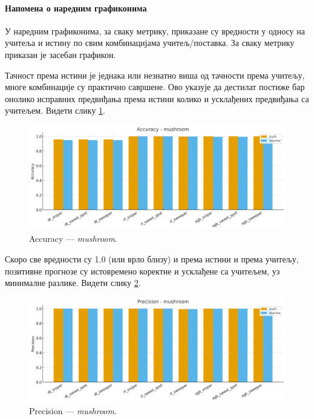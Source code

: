 \paragraph{Напомена о наредним графиконима} У наредним графиконима, за сваку метрику, приказане су вредности у односу на учитеља и истину по свим комбинацијама учитељ/поставка. За сваку метрику приказан је засебан графикон.

Тачност према истини је једнака или незнатно виша од тачности према учитељу, многе комбинације су практично савршене. Ово указује да дестилат постиже бар онолико исправних предвиђања према истини колико и усклађених предвиђања са учитељем. Видети слику \ref{fig:mush-acc}.
\begin{figure}[H]
  \centering
  \includegraphics[width=.85\linewidth]{images/charts/accuracy_simple_mushroom.png}
  \caption{Accuracy — \textit{mushroom}.}
  \label{fig:mush-acc}
\end{figure}

Скоро све вредности су 1.0 (или врло близу) и према истини и према учитељу, позитивне прогнозе су истовремено коректне и усклађене са учитељем, уз минималне разлике. Видети слику \ref{fig:mush-prec}.
\begin{figure}[H]
  \centering
  \includegraphics[width=.85\linewidth]{images/charts/precision_simple_mushroom.png}
  \caption{Precision — \textit{mushroom}.}
  \label{fig:mush-prec}
\end{figure}

